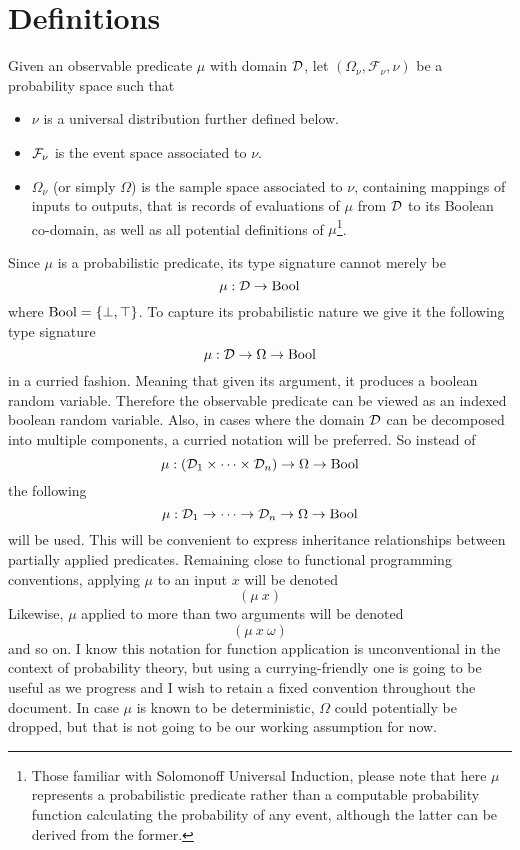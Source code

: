 \documentclass[]{article}
\begin{document}
\section{Definitions}
Given an observable predicate $\mu$ with domain $\mathcal{D}$, let
$(\Omega_\nu, \mathcal{F_\nu}, \nu)$ be a probability space such that
\begin{itemize}
\item $\nu$ is a universal distribution further defined below.
\item $\mathcal{F}_\nu$ is the event space associated to $\nu$.
\item $\Omega_\nu$ (or simply $\Omega$) is the sample space associated
  to $\nu$, containing mappings of inputs to outputs, that is records
  of evaluations of $\mu$ from $\mathcal{D}$ to its Boolean co-domain, as
  well as all potential definitions of $\mu$\footnote{Those familiar
  with Solomonoff Universal Induction, please note that here $\mu$
  represents a probabilistic predicate rather than a computable
  probability function calculating the probability of any event,
  although the latter can be derived from the former.}.
\end{itemize}
Since $\mu$ is a probabilistic predicate, its type signature cannot
merely be
$$\mu : \mathcal{D} \to \textup{Bool}$$ where $\textup{Bool} = \{\bot, \top\}$.  To capture
its probabilistic nature we give it the following type signature
$$\mu : \mathcal{D} \to \Omega \to \textup{Bool}$$ in a curried fashion.  Meaning
that given its argument, it produces a boolean random variable.
Therefore the observable predicate can be viewed as an indexed boolean
random variable.  Also, in cases where the domain $\mathcal{D}$ can be
decomposed into multiple components, a curried notation will be
preferred.  So instead of
$$\mu : (\mathcal{D}_1 \times \dots \times \mathcal{D}_n) \to \Omega \to \textup{Bool}$$
the following
$$\mu : \mathcal{D}_1 \to \dots \to \mathcal{D}_n \to \Omega \to \textup{Bool}$$ will
be used.  This will be convenient to express inheritance relationships
between partially applied predicates.  Remaining close to functional
programming conventions, applying $\mu$ to an input $x$ will be
denoted
$$(\mu\ x)$$ Likewise, $\mu$ applied to more than two arguments will
be denoted
$$(\mu\ x\ \omega)$$ and so on.  I know this notation for function
application is unconventional in the context of probability theory,
but using a currying-friendly one is going to be useful as we progress
and I wish to retain a fixed convention throughout the document.  In
case $\mu$ is known to be deterministic, $\Omega$ could potentially be
dropped, but that is not going to be our working assumption for now.
\end{document}
